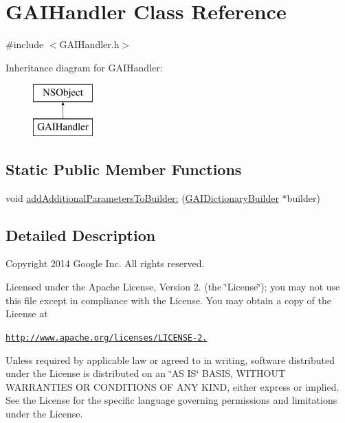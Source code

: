 \hypertarget{class_g_a_i_handler}{}\section{G\+A\+I\+Handler Class Reference}
\label{class_g_a_i_handler}


{\ttfamily \#include $<$G\+A\+I\+Handler.\+h$>$}

Inheritance diagram for G\+A\+I\+Handler\+:\begin{figure}[H]
\begin{center}
\leavevmode
\includegraphics[height=2.000000cm]{class_g_a_i_handler}
\end{center}
\end{figure}
\subsection*{Static Public Member Functions}
\begin{DoxyCompactItemize}
\item 
void \hyperlink{class_g_a_i_handler_a94ebfe68a07ecb28a086667eb7dab53f}{add\+Additional\+Parameters\+To\+Builder\+:} (\hyperlink{interface_g_a_i_dictionary_builder}{G\+A\+I\+Dictionary\+Builder} $\ast$builder)
\end{DoxyCompactItemize}


\subsection{Detailed Description}
Copyright 2014 Google Inc. All rights reserved.

Licensed under the Apache License, Version 2. (the \char`\"{}\+License\char`\"{}); you may not use this file except in compliance with the License. You may obtain a copy of the License at

\href{http://www.apache.org/licenses/LICENSE-2.0}{\tt http\+://www.\+apache.\+org/licenses/\+L\+I\+C\+E\+N\+S\+E-\/2.}

Unless required by applicable law or agreed to in writing, software distributed under the License is distributed on an \char`\"{}\+A\+S I\+S\char`\"{} B\+A\+S\+IS, W\+I\+T\+H\+O\+UT W\+A\+R\+R\+A\+N\+T\+I\+ES OR C\+O\+N\+D\+I\+T\+I\+O\+NS OF A\+NY K\+I\+ND, either express or implied. See the License for the specific language governing permissions and limitations under the License. 


